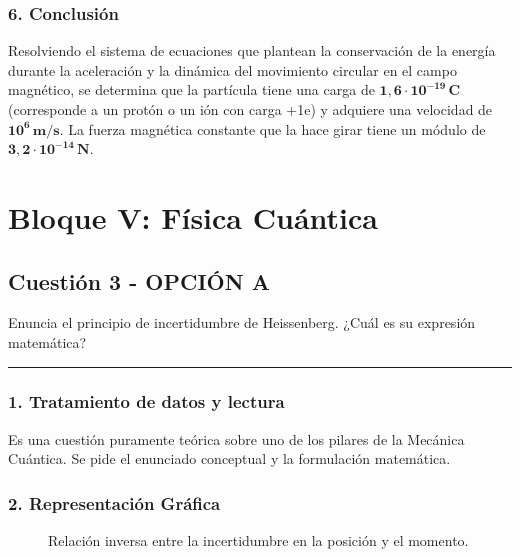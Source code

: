 \subsubsection*{6. Conclusión}
\begin{cajaconclusion}
    Resolviendo el sistema de ecuaciones que plantean la conservación de la energía durante la aceleración y la dinámica del movimiento circular en el campo magnético, se determina que la partícula tiene una carga de $\mathbf{1,6 \cdot 10^{-19} \, C}$ (corresponde a un protón o un ión con carga +1e) y adquiere una velocidad de $\mathbf{10^6 \, m/s}$. La fuerza magnética constante que la hace girar tiene un módulo de $\mathbf{3,2 \cdot 10^{-14} \, N}$.
\end{cajaconclusion}

\newpage

\section{Bloque V: Física Cuántica}
\label{sec:cuantica_2005_sep_cv}

\subsection{Cuestión 3 - OPCIÓN A}
\label{subsec:5A_2005_sep_cv}

\begin{cajaenunciado}
Enuncia el principio de incertidumbre de Heissenberg. ¿Cuál es su expresión matemática?
\end{cajaenunciado}
\hrule

\subsubsection*{1. Tratamiento de datos y lectura}
Es una cuestión puramente teórica sobre uno de los pilares de la Mecánica Cuántica. Se pide el enunciado conceptual y la formulación matemática.

\subsubsection*{2. Representación Gráfica}
\begin{figure}[H]
    \centering
    \caption{Relación inversa entre la incertidumbre en la posición y el momento.}
\end{figure}


